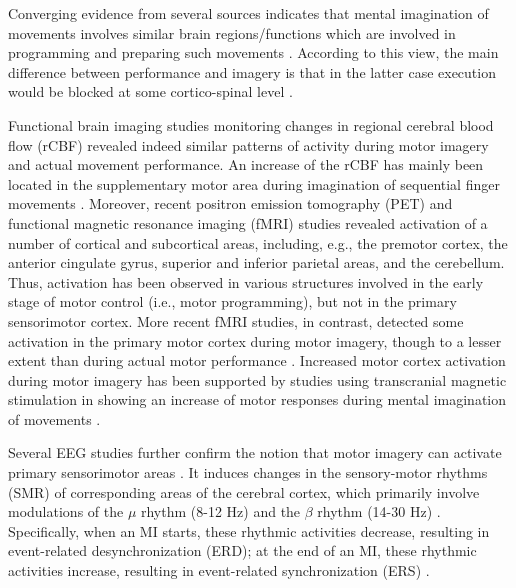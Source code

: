 \documentclass[journal,twocolumn]{IEEEtran}
\begin{document}
Converging evidence from several sources indicates that mental imagination of movements involves similar brain regions/functions which are involved in programming and preparing such movements \cite{jeannerod1995mental}. According to this view, the main difference between performance and imagery is that in the latter case execution would be blocked at some cortico-spinal level \cite{decety1994mapping}.

Functional brain imaging studies monitoring changes in regional cerebral blood flow (rCBF) revealed indeed similar patterns of activity during motor imagery and actual movement performance. An increase of the rCBF has mainly been located in the supplementary motor area during imagination of sequential finger movements \cite{roland1980supplementary}. Moreover, recent positron emission tomography (PET) \cite{decety1994mapping} and functional magnetic resonance imaging (fMRI) studies \cite{rao1993functional} revealed activation of a number of cortical and subcortical areas, including, e.g., the premotor cortex, the anterior cingulate gyrus, superior and inferior parietal areas, and the cerebellum. Thus, activation has been observed in various structures involved in the early stage of motor control (i.e., motor programming), but not in the primary sensorimotor cortex. More recent fMRI studies, in contrast, detected some activation in the primary motor cortex during motor imagery, though to a lesser extent than during actual motor performance \cite{hallett1994involvement}. Increased motor cortex activation during motor imagery has been supported by studies using transcranial magnetic stimulation in showing an increase of motor responses during mental imagination of movements \cite{gandevia1987knowledge}.

Several EEG studies further confirm the notion that motor imagery can activate primary sensorimotor areas \cite{beisteiner1995mental}. It induces changes in the sensory-motor rhythms (SMR) of corresponding areas of the cerebral cortex, which primarily involve modulations of the $\mu$ rhythm (8-12 Hz) and the $\beta$ rhythm (14-30 Hz) \cite{jeannerod1995mental}. Specifically, when an MI starts, these rhythmic activities decrease, resulting in event-related desynchronization (ERD); at the end of an MI, these rhythmic activities increase, resulting in event-related synchronization (ERS) \cite{pfurtscheller1997eeg}.
\end{document}
